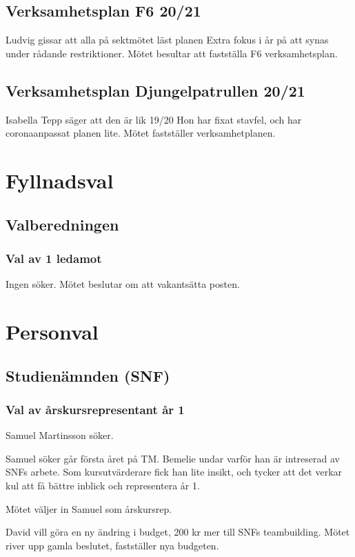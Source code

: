 \documentclass{sektionsmote}
\begin{document}
\subsection{Verksamhetsplan F6 20/21}
Ludvig gissar att alla på sektmötet läst planen
Extra fokus i år på att synas under rådande restriktioner.
Mötet besultar att fastställa F6 verksamhetsplan.

\subsection{Verksamhetsplan Djungelpatrullen 20/21}
Isabella Tepp säger att den är lik 19/20
Hon har fixat stavfel, och har coronaanpassat planen lite.
Mötet fastställer verksamhetplanen.


\section{Fyllnadsval}

\subsection{Valberedningen}

\subsubsection{Val av 1 ledamot}
Ingen söker.
Mötet beslutar om att vakantsätta posten.


\section{Personval}

\subsection{Studienämnden (SNF)}

\subsubsection{Val av årskursrepresentant år 1}
Samuel Martinsson söker.

Samuel söker går första året på TM.
Bemelie undar varför han är intreserad av SNFs arbete.
Som kursutvärderare fick han lite insikt, och tycker att det verkar kul att få bättre inblick och representera år 1.

Mötet väljer in Samuel som årskursrep.

\begin{ofraga} \label{uppriven-budget}
    David vill göra en ny ändring i budget, 200 kr mer till SNFs teambuilding.
    Mötet river upp gamla beslutet, fastställer nya budgeten.
\end{ofraga}
\end{document}
